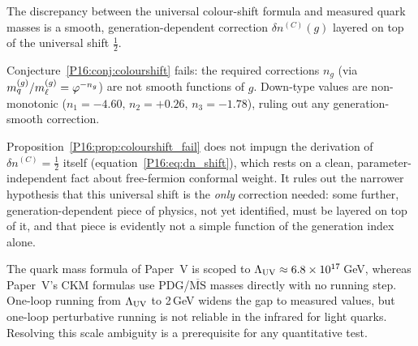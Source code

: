 \begin{conjecture}
\label{P16:conj:colourshift}
The discrepancy between the universal colour-shift formula and measured
quark masses is a smooth, generation-dependent correction $\delta n^{(C)}(g)$
layered on top of the universal shift $\tfrac{1}{2}$.
\end{conjecture}

\begin{proposition}
\label{P16:prop:colourshift_fail}
Conjecture~\ref{P16:conj:colourshift} fails: the required corrections
$n_g$ (via $m_q^{(g)}/m_\ell^{(g)}=\varphi^{-n_g}$) are not smooth
functions of $g$. Down-type values are non-monotonic
($n_1=-4.60,\,n_2=+0.26,\,n_3=-1.78$), ruling out any
generation-smooth correction.
\end{proposition}

\begin{remark}
\label{P16:rem:colourshift_scope}
Proposition~\ref{P16:prop:colourshift_fail} does not impugn the derivation
of $\delta n^{(C)}=\tfrac12$ itself (equation~\eqref{P16:eq:dn_shift}),
which rests on a clean, parameter-independent fact about free-fermion
conformal weight. It rules out the narrower hypothesis that this
universal shift is the \emph{only} correction needed: some further,
generation-dependent piece of physics, not yet identified, must be
layered on top of it, and that piece is evidently not a simple
function of the generation index alone.
\end{remark}

\begin{remark}
\label{P16:rem:scale_ambiguity}
The quark mass formula of Paper~V is scoped to $\Lambda_{\mathrm{UV}}\approx6.8\times10^{17}$\,GeV,
whereas Paper~V's CKM formulas use PDG/$\overline{\mathrm{MS}}$ masses
directly with no running step. One-loop running from $\Lambda_{\mathrm{UV}}$ to 2\,GeV
widens the gap to measured values, but one-loop perturbative running is
not reliable in the infrared for light quarks. Resolving this scale
ambiguity is a prerequisite for any quantitative test.
\end{remark}

